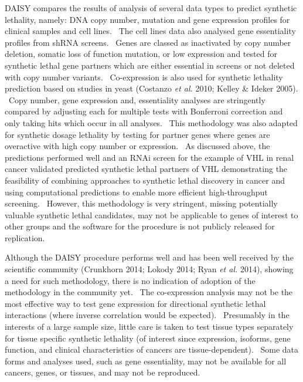 DAISY compares the results of analysis of several data types to predict synthetic lethality, namely: DNA copy number, mutation and gene expression profiles for clinical samples and cell lines. \ The cell lines data also analysed gene essentiality profiles from shRNA screens. \ Genes are classed as inactivated by copy number deletion, somatic loss of function mutation, or low expression and tested for synthetic lethal gene partners which are either essential in screens or not deleted with copy number variants. \ Co-expression is also used for synthetic lethality prediction based on studies in yeast (Costanzo\textit{ et al.} 2010; Kelley \& Ideker 2005). \ Copy number, gene expression and, essentiality analyses are stringently compared by adjusting each for multiple tests with Bonferroni correction and only taking hits which occur in all analyses. \ This methodology was also adapted for synthetic dosage lethality by testing for partner genes where genes are overactive with high copy number or expression. \ As discussed above, the predictions performed well and an RNAi screen for the example of VHL in renal cancer validated predicted synthetic lethal partners of VHL demonstrating the feasibility of combining approaches to synthetic lethal discovery in cancer and using computational predictions to enable more efficient high-throughput screening. \ However, this methodology is very stringent, missing potentially valuable synthetic lethal candidates, may not be applicable to genes of interest to other groups and the software for the procedure is not publicly released for replication.  

Although the DAISY procedure performs well and has been well received by the scientific community (Crunkhorn 2014; Lokody 2014; Ryan\textit{ et al.} 2014), showing a need for such methodology, there is no indication of adoption of the methodology in the community yet. \ The co-expression analysis may not be the most effective way to test gene expression for directional synthetic lethal interactions (where inverse correlation would be expected). \ Presumably in the interests of a large sample size, little care is taken to test tissue types separately for tissue specific synthetic lethality (of interest since expression, isoforms, gene function, and clinical characteristics of cancers are tissue-dependent). \ Some data forms and analyses used, such as gene essentiality, may not be available for all cancers, genes, or tissues, and may not be reproduced. \  

